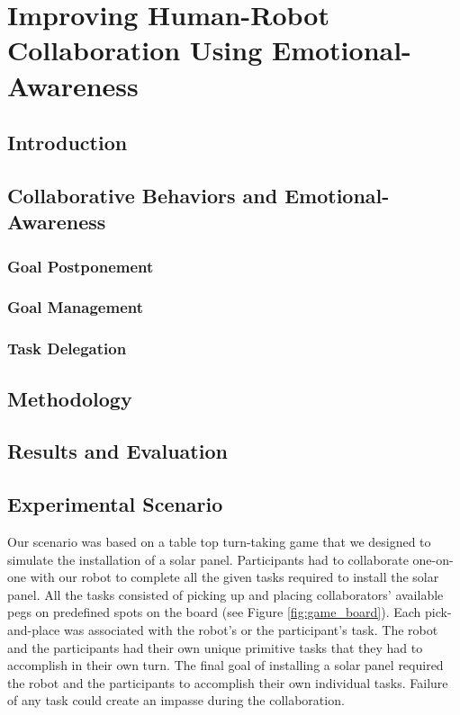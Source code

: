 \documentclass[12pt]{report}
\begin{document}
\chapter{Improving Human-Robot Collaboration Using Emotional-Awareness}
\label{ch:awareness}

\section{Introduction}

\section{Collaborative Behaviors and Emotional-Awareness}

\subsection{Goal Postponement}

\subsection{Goal Management}

\subsection{Task Delegation}

\section{Methodology}

\section{Results and Evaluation}


\section{Experimental Scenario}

Our scenario was based on a table top turn-taking game that we designed to
simulate the installation of a solar panel. Participants had to collaborate
one-on-one with our robot to complete all the given tasks required to install
the solar panel. All the tasks consisted of picking up and placing
collaborators' available pegs on predefined spots on the board (see Figure
\ref{fig:game_board}). Each pick-and-place was associated with the robot's or
the participant's task. The robot and the participants had their own unique
primitive tasks that they had to accomplish in their own turn. The final goal of
installing a solar panel required the robot and the participants to accomplish
their own individual tasks. Failure of any task could create an impasse during
the collaboration.
\end{document}
